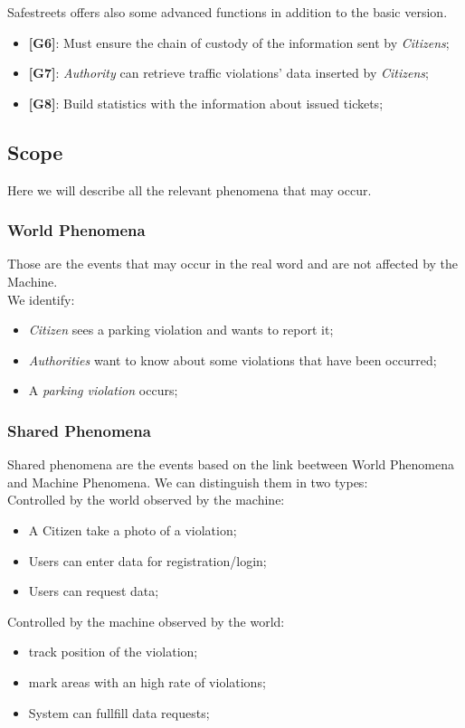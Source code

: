 \documentclass{article}
\begin{document}
Safestreets offers also some advanced functions in addition to the basic version.
\begin{itemize}
    \item \textbf{[G6]}: Must ensure the chain of custody of the information sent by \textit{Citizens};
    \item \textbf{[G7]}: \textit{Authority} can retrieve traffic violations' data inserted by \textit{Citizens};
    \item \textbf{[G8]}: Build statistics with the information about issued tickets;
\end{itemize}

\subsection{Scope}
Here we will describe all the relevant phenomena that may occur. 

\subsubsection{World Phenomena}
Those are the events that may occur in the real word and are not affected by the Machine.
\\We identify:
\begin{itemize}
    \item \textit{Citizen} sees a parking violation and wants to report it;
    \item \textit{Authorities} want to know about some violations that have been occurred;
    \item A \textit{parking violation} occurs; 
\end{itemize} 

\subsubsection{Shared Phenomena}
Shared phenomena are the events based on the link beetween World Phenomena and Machine Phenomena.
We can distinguish them in two types:
\\
Controlled by the world observed by the machine:
\begin{itemize}
    \item A Citizen take a photo of a violation;
    \item Users can enter data for registration/login;
    \item Users can request data;
\end{itemize}
Controlled by the machine observed by the world:
\begin{itemize}
    \item track position of the violation;
    \item mark areas with an high rate of violations;
    \item System can fullfill data requests;
\end{itemize}
\end{document}
